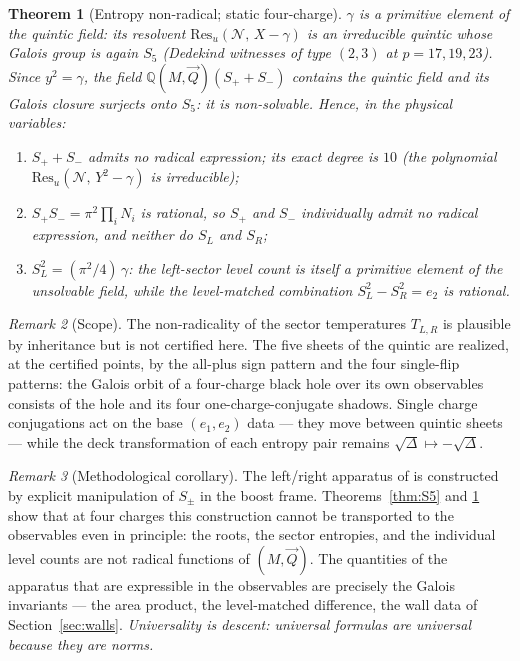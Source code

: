 \documentclass[11pt]{article}
\newtheorem{theorem}{Theorem}[section]
\theoremstyle{definition}
\theoremstyle{remark}
\newtheorem{remark}[theorem]{Remark}
\newcommand{\Q}{\mathbb{Q}}
\newcommand{\disc}{\Delta}
\newcommand{\Res}{\mathrm{Res}}
\begin{document}
\begin{theorem}[Entropy non-radical; static four-charge]
\label{thm:entropy}
$\gamma$ is a primitive element of the quintic field: its resolvent
$\Res_u(\mathcal N,\,X-\gamma)$ is an irreducible quintic whose Galois group
is again $S_5$ (Dedekind witnesses of type $(2,3)$ at $p=17,19,23$). Since
$y^2=\gamma$, the field $\Q(M,\vec Q)(S_++S_-)$ contains the quintic field and
its Galois closure surjects onto $S_5$: it is non-solvable. Hence, in the
physical variables:
\begin{enumerate}
\item $S_++S_-$ admits no radical expression; its exact degree is $10$
(the polynomial $\Res_u(\mathcal N,\,Y^2-\gamma)$ is irreducible);
\item $S_+S_-=\pi^2\prod_iN_i$ is rational, so $S_+$ and $S_-$ individually
admit no radical expression, and neither do $S_L$ and $S_R$;
\item $S_L^2=(\pi^2/4)\,\gamma$: the left-sector level count is itself a
primitive element of the unsolvable field, while the level-matched
combination $S_L^2-S_R^2=e_2$ is rational.
\end{enumerate}
\end{theorem}

\begin{remark}[Scope]
The non-radicality of the sector temperatures $T_{L,R}$ is plausible by
inheritance but is not certified here. The five sheets
of the quintic are realized, at the certified points, by the all-plus sign
pattern and the four single-flip patterns: the Galois orbit of a four-charge
black hole over its own observables consists of the hole and its four
one-charge-conjugate shadows. Single charge conjugations act on the base
$(e_1,e_2)$ data --- they move between quintic sheets --- while the deck
transformation of each entropy pair remains
$\sqrt{\disc}\mapsto-\sqrt{\disc}$.
\end{remark}

\begin{remark}[Methodological corollary]
The left/right apparatus of \cite{CL1,CL2,CGLP2018} is constructed by explicit
manipulation of $S_\pm$ in the boost frame. Theorems~\ref{thm:S5} and
\ref{thm:entropy} show that at four charges this construction cannot be
transported to the observables even in principle: the roots, the sector
entropies, and the individual level counts are not radical functions of
$(M,\vec Q)$. The quantities of the apparatus that are expressible in the
observables are precisely the Galois invariants --- the area product, the
level-matched difference, the wall data of Section~\ref{sec:walls}.
\emph{Universality is descent: universal formulas are universal because they
are norms.}
\end{remark}
\end{document}
